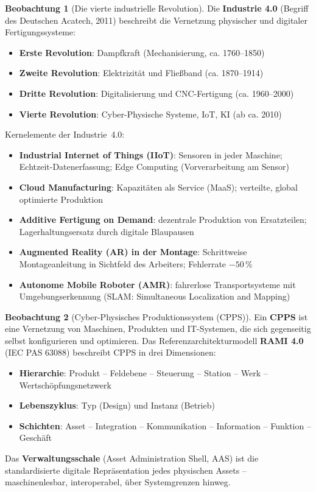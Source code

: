 ﻿\documentclass[a4paper,12pt]{report}
\theoremstyle{definition}
\newtheorem{beobachtung}{Beobachtung}
\begin{document}
\begin{beobachtung}[Die vierte industrielle Revolution]
Die \textbf{Industrie 4.0} (Begriff des Deutschen Acatech, 2011)
beschreibt die Vernetzung physischer und digitaler Fertigungssysteme:
\begin{itemize}
    \item[-] \textbf{Erste Revolution}: Dampfkraft (Mechanisierung, ca. 1760--1850)
    \item[-] \textbf{Zweite Revolution}: Elektrizität und Fließband (ca. 1870--1914)
    \item[-] \textbf{Dritte Revolution}: Digitalisierung und CNC-Fertigung (ca. 1960--2000)
    \item[-] \textbf{Vierte Revolution}: Cyber-Physische Systeme, IoT, KI (ab ca. 2010)
\end{itemize}
Kernelemente der Industrie~4.0:
\begin{itemize}
    \item[-] \textbf{Industrial Internet of Things (IIoT)}: Sensoren in jeder Maschine;
          Echtzeit-Datenerfassung; Edge Computing (Vorverarbeitung am Sensor)
    \item[-] \textbf{Cloud Manufacturing}: Kapazitäten als Service (MaaS);
          verteilte, global optimierte Produktion
    \item[-] \textbf{Additive Fertigung on Demand}: dezentrale Produktion
          von Ersatzteilen; Lagerhaltungsersatz durch digitale Blaupausen
    \item[-] \textbf{Augmented Reality (AR) in der Montage}: Schrittweise
          Montageanleitung in Sichtfeld des Arbeiters; Fehlerrate $-50\,\%$
    \item[-] \textbf{Autonome Mobile Roboter (AMR)}: fahrerlose Transportsysteme
          mit Umgebungserkennung (SLAM: Simultaneous Localization and Mapping)
\end{itemize}
\end{beobachtung}

\begin{beobachtung}[Cyber-Physisches Produktionssystem (CPPS)]
Ein \textbf{CPPS} ist eine Vernetzung von Maschinen, Produkten und
IT-Systemen, die sich gegenseitig selbst konfigurieren und optimieren.
Das Referenzarchitekturmodell \textbf{RAMI 4.0} (IEC PAS 63088)
beschreibt CPPS in drei Dimensionen:
\begin{itemize}
    \item[-] \textbf{Hierarchie}: Produkt -- Feldebene -- Steuerung -- Station -- Werk -- Wertschöpfungsnetzwerk
    \item[-] \textbf{Lebenszyklus}: Typ (Design) und Instanz (Betrieb)
    \item[-] \textbf{Schichten}: Asset -- Integration -- Kommunikation -- Information -- Funktion -- Geschäft
\end{itemize}
Das \textbf{Verwaltungsschale} (Asset Administration Shell, AAS) ist
die standardisierte digitale Repräsentation jedes physischen Assets --
maschinenlesbar, interoperabel, über Systemgrenzen hinweg.
\end{beobachtung}
\end{document}
